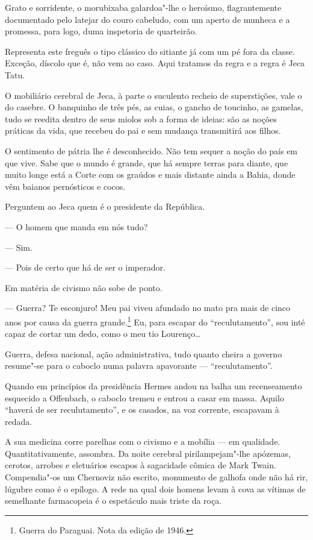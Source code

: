 Grato e sorridente, o morubixaba galardoa"-lhe o heroísmo, flagrantemente
documentado pelo latejar do couro cabeludo, com um aperto de munheca e a
promessa, para logo, duma inspetoria de quarteirão.

Representa este freguês o tipo clássico do sitiante já com um pé fora da
classe. Exceção, díscolo que é, não vem ao caso. Aqui tratamos da regra
e a regra é Jeca Tatu.

O mobiliário cerebral de Jeca, à parte o suculento recheio de
superstições, vale o do casebre. O banquinho de três pés, as cuias, o
gancho de toucinho, as gamelas, tudo se reedita dentro de seus miolos
sob a forma de ideias: são as noções práticas da vida, que recebeu do
pai e sem mudança transmitirá aos filhos.

O sentimento de pátria lhe é desconhecido. Não tem sequer a noção do
país em que vive. Sabe que o mundo é grande, que há sempre terras para
diante, que muito longe está a Corte com os graúdos e mais distante
ainda a Bahia, donde vêm baianos pernósticos e cocos.

Perguntem ao Jeca quem é o presidente da República.

--- O homem que manda em nós tudo?

--- Sim.

--- Pois de certo que há de ser o imperador.

Em matéria de civismo não sobe de ponto.

--- Guerra? Te esconjuro! Meu pai viveu afundado no mato pra mais de
cinco anos por causa da guerra grande.\footnote{Guerra do Paraguai. Nota
  da edição de 1946.} Eu, para escapar do ``reculutamento'', sou inté
capaz de cortar um dedo, como o meu tio Lourenço\ldots{}

Guerra, defesa nacional, ação administrativa, tudo quanto cheira a
governo resume"-se para o caboclo numa palavra apavorante ---
``reculutamento''.

Quando em princípios da presidência Hermes andou na balha um
recenseamento esquecido a Offenbach, o caboclo tremeu e entrou a casar
em massa. Aquilo ``haverá de ser reculutamento'', e os casados, na voz
corrente, escapavam à redada.

A sua medicina corre parelhas com o civismo e a mobília --- em
qualidade. Quantitativamente, assombra. Da noite cerebral
pirilampejam"-lhe apózemas, cerotos, arrobes e eletuários escapos à
sagacidade cômica de Mark Twain. Compendia"-os um Chernoviz não escrito,
monumento de galhofa onde não há rir, lúgubre como é o epílogo. A rede
na qual dois homens levam à cova as vítimas de semelhante farmacopeia é
o espetáculo mais triste da roça.

